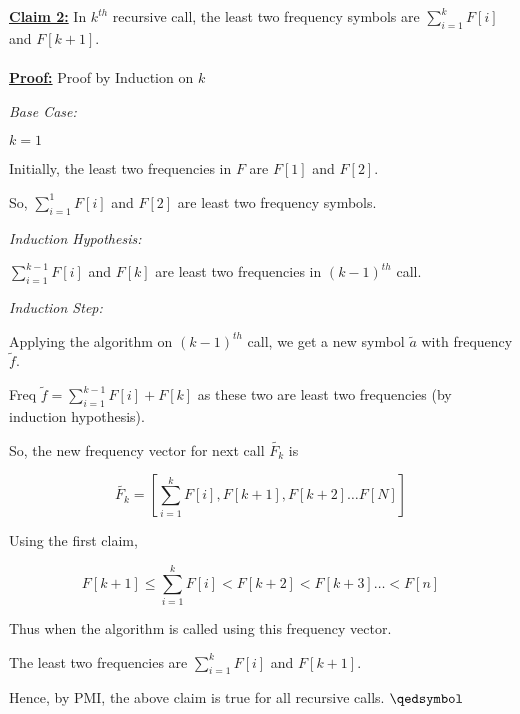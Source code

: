 \documentclass[a4paper]{article}
\begin{document}
\begin{enumerate}[(a)]
    
    \underline{\textbf{Claim 2:}} In $k^{th}$ recursive call, the least two frequency symbols are $\sum_{i=1}^{k} F[i]$ and $F[k+1]$.\\ \\
    \underline{\textbf{Proof:}} Proof by Induction on $k$ \\
    {\textit{Base Case:} \par}
    {\hspace{10mm}    $k = 1$ \par} 
    {\hspace{10mm}  Initially, the least two frequencies in $F$ are $F[1]$ and $F[2]$.\par}
    {\hspace{10mm}  So, $\sum_{i=1}^{1} F[i]$ and $F[2]$ are least two frequency symbols.\par}
    {\textit{Induction Hypothesis:} 
    \par}
    {\hspace{10mm} $\sum_{i=1}^{k-1} F[i]$ and $F[k]$ are least two frequencies in $(k-1)^{th}$ call.\par}
    {\textit{Induction Step:} \par}
    {\hspace{10mm} Applying the algorithm on $(k-1)^{th}$ call, we get a new symbol $\tilde{a}$ with frequency $\tilde{f}$.\par}
    {\hspace{10mm} Freq $\tilde{f} = \sum_{i=1}^{k-1} F[i] + F[k]$ as these two are least two frequencies (by induction hypothesis).\par}
    {\hspace{10mm} So, the new frequency vector for next call $\tilde{F_k}$ is \par}
    {\begin{equation}
        \tilde{F_k} = [ \sum_{i=1}^{k} F[i], F[k+1], F[k+2] \dots F[N]]
    \end{equation}}
    {\hspace{10mm} Using the first claim, \par}
    {\begin{equation}
        F[k+1] \leq \sum_{i=1}^{k} F[i] < F[k+2] < F[k+3] \dots < F[n]
    \end{equation}}
    {\hspace{10mm}Thus when the algorithm is called using this frequency vector. \par}
    {\hspace{10mm} The least two frequencies are $\sum_{i=1}^{k} F[i]$ and $F[k+1]$.\par}
    Hence, by PMI, the above claim is true for all recursive calls. {\hfill$\qedsymbol$}\\ 
    

\end{enumerate}
\end{document}
